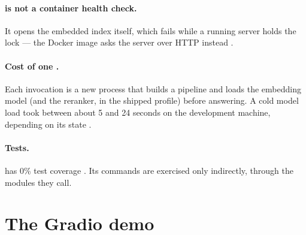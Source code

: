 \paragraph{ is not a container health check.} It opens the embedded index itself, which fails while a running server holds the lock --- the Docker image asks the server over HTTP instead .

\paragraph{Cost of one .} Each invocation is a new process that builds a pipeline and loads the embedding model (and the reranker, in the shipped profile) before answering. A cold model load took between about 5 and 24 seconds on the development machine, depending on its state \tagM.

\paragraph{Tests.}  has 0\% test coverage \tagM. Its commands are exercised only indirectly, through the modules they call.

\section{The Gradio demo}
\label{sec:demo}

